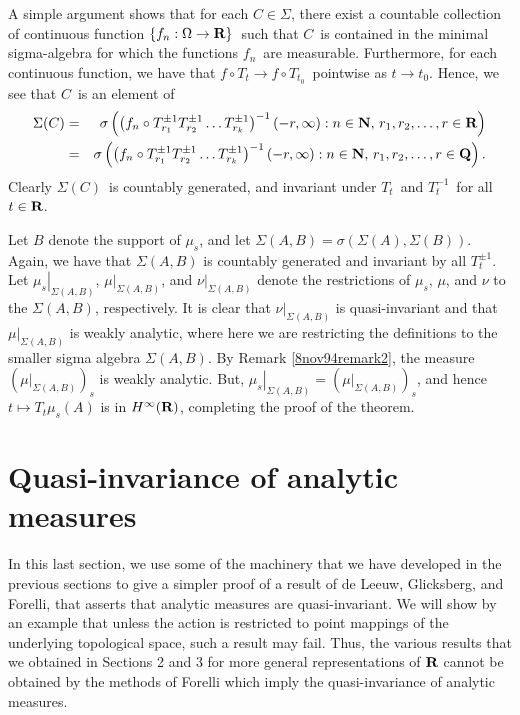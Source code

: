 A simple argument shows that
for each $C\in \Sigma$, there exist a countable collection
of continuous function $\{f_n:\Omega\to\R\}$\ such that $C$\ is contained
in the minimal sigma-algebra for which the functions $f_n$\ are measurable.
Furthermore, for each continuous function, we have that 
$f\circ T_t \to f\circ T_{t_0}$\ pointwise as $t\to t_0$.  Hence, we see that
$C$\ is an element of 
\begin{eqnarray*}
\Sigma(C) 
&=&
\sigma \left(
\left( f_n\circ T_{r_{1}}^{\pm 1} 
T_{r_{2}}^{\pm 1}
\ldots
T_{r_{k}}^{\pm 1}\right)^{-1} (-r,\infty):n\in \N,\,r_1,r_2,\dots,r\in\R
\right) \\
&=&
\sigma\left( 
\left(f_n\circ T_{r_{1}}^{\pm 1} 
T_{r_{2}}^{\pm 1}
\ldots
T_{r_{k}}^{\pm 1} \right)^{-1}
(-r,\infty):n\in \N,\,r_1,r_2,\dots,r\in\Q\right) .
\end{eqnarray*}
Clearly $\Sigma(C)$\ is countably generated, and
invariant under $T_t$\ and $T_t^{-1}$\ for all
$t \in \R$.

Let $B$ denote the support of $\mu_s$, and let 
$\Sigma(A,B)=\sigma\left( \Sigma(A),\Sigma(B)\right)$.
Again, we have that $\Sigma(A,B)$ is countably generated
and invariant by all $T_t^{\pm 1}$.  
Let $\left. \mu_s\right|_{\Sigma(A,B)}$, 
$\left. \mu\right|_{\Sigma(A,B)}$,
and
$\left. \nu\right|_{\Sigma(A,B)}$
denote the restrictions of $\mu_s$, $\mu$, and 
$\nu$ to the
$\Sigma(A,B)$, respectively.
It is clear that
$\left. \nu\right|_{\Sigma(A,B)}$
is quasi-invariant and that 
$\left. \mu\right|_{\Sigma(A,B)}$
is weakly analytic, where here we are restricting
the definitions to the smaller sigma algebra $\Sigma(A,B)$.
By Remark \ref{8nov94remark2},
the measure
$\left( \left. \mu\right|_{\Sigma(A,B)}\right)_s$
is weakly analytic.  But,
$\left. \mu_s\right|_{\Sigma(A,B)}=
\left( \left. \mu\right|_{\Sigma(A,B)}\right)_s$,
and hence $t\mapsto T_t\mu_s(A)$ is in $H^\infty (\R)$,
completing the proof of the theorem.

\section{Quasi-invariance of analytic measures} 
\newtheorem{lemma1qi}{Lemma}[section]
\newtheorem{lemma2qi}[lemma1qi]{Lemma}
\newtheorem{lemma3qi}[lemma1qi]{Lemma}
\newtheorem{thqi}[lemma1qi]{Theorem}
\newtheorem{exqi}[lemma1qi]{Example}
In this last section, 
we use some of the machinery that we have developed in the 
previous sections to give a simpler proof of a result
of de Leeuw, Glicksberg, and Forelli, that asserts
that analytic measures are quasi-invariant.  
We will show by an example that unless the action is restricted
to point mappings of the underlying topological space, 
such a result may fail.
Thus, the various results that we obtained in Sections
2 and 3 for more general representations 
of $\R$ cannot be obtained by the
methods of Forelli \cite{forelli} which imply the 
quasi-invariance of analytic measures.

